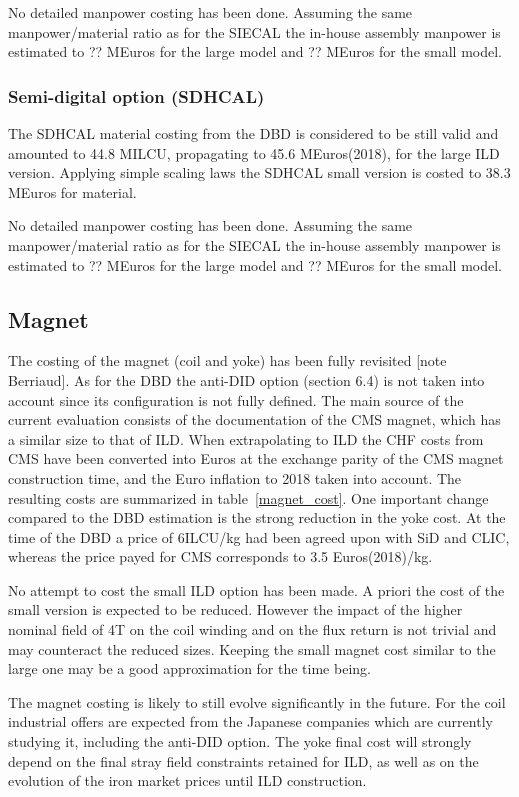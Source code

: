 No detailed manpower costing has been done. Assuming the same manpower/material ratio as for the SIECAL the in-house assembly manpower is estimated to ?? MEuros for the large model and ?? MEuros for the small model.

\subsubsection{Semi-digital option (SDHCAL)}

The SDHCAL material costing from the DBD is considered to be still valid and amounted to 44.8 MILCU, propagating to 45.6 MEuros(2018), for the large ILD version. Applying simple scaling laws the SDHCAL small version is costed to 38.3 MEuros for material.

No detailed manpower costing has been done. Assuming the same manpower/material ratio as for the SIECAL the in-house assembly manpower is estimated to ?? MEuros for the large model and ?? MEuros for the small model.

\subsection{Magnet}
The costing of the magnet (coil and yoke) has been fully revisited [note Berriaud]. As for the DBD the anti-DID option (section 6.4) is not taken into account since its configuration is not fully defined. The main source of the current evaluation consists of the documentation of the CMS magnet, which has a similar size to that of ILD. When extrapolating to ILD the CHF costs from CMS have been converted into Euros at the exchange parity of the CMS magnet construction time, and the Euro inflation to 2018 taken into account. The resulting costs are summarized in table~\ref{magnet_cost}. One important change compared to the DBD estimation is the strong reduction in the yoke cost. At the time of the DBD a price of 6ILCU/kg had been agreed upon with SiD and CLIC, whereas the price payed for CMS corresponds to 3.5 Euros(2018)/kg. 

No attempt to cost the small ILD option has been made. A priori the cost of the small version is expected to be reduced. However the impact of the higher nominal field of 4T on the coil winding and on the flux return is not trivial and may counteract the reduced sizes. Keeping the small magnet cost similar to the large one may be a good approximation for the time being.

The magnet costing is likely to still evolve significantly in the future. For the coil industrial offers are expected from the Japanese companies which are currently studying it, including the anti-DID option. The yoke final cost will strongly depend on the final stray field constraints retained for ILD, as well as on the evolution of the iron market prices until ILD construction.

